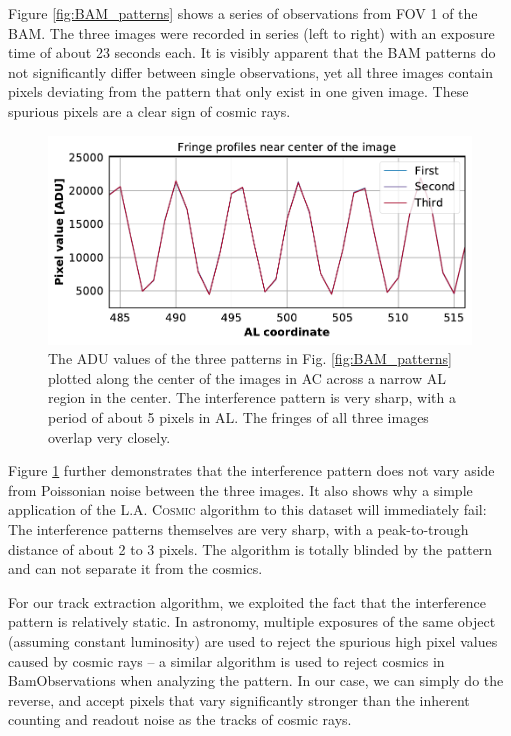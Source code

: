 \documentclass[a4paper, 11pt]{article}
\begin{document}
Figure \ref{fig:BAM_patterns} shows a series of observations from FOV 1 of the BAM. The three images were recorded in series (left to right) with an exposure time of about 23 seconds each. It is visibly apparent that the BAM patterns do not significantly differ between single observations, yet all three images contain pixels deviating from the pattern that only exist in one given image. These spurious pixels are a clear sign of cosmic rays.

\begin{figure}
  \centering
  \includegraphics[width=\textwidth]{images/extraction/BAM-OBS_fringes}
  \caption{The ADU values of the three patterns in Fig. \ref{fig:BAM_patterns} plotted along the center of the images in AC across a narrow AL region in the center. The interference pattern is very sharp, with a period of about 5 pixels in AL. The fringes of all three images overlap very closely.}
  \label{fig:BAM_fringes}
\end{figure}

Figure \ref{fig:BAM_fringes} further demonstrates that the interference pattern does not vary aside from Poissonian noise between the three images. It also shows why a simple application of the \textsc{L.A. Cosmic} algorithm to this dataset will immediately fail: The interference patterns themselves are very sharp, with a peak-to-trough distance of about 2 to 3 pixels. The algorithm is totally blinded by the pattern and can not separate it from the cosmics.

For our track extraction algorithm, we exploited the fact that the interference pattern is relatively static. In astronomy, multiple exposures of the same object (assuming constant luminosity) are used to reject the spurious high pixel values caused by cosmic rays -- a similar algorithm is used to reject cosmics in BamObservations when analyzing the pattern. In our case, we can simply do the reverse, and accept pixels that vary significantly stronger than the inherent counting and readout noise as the tracks of cosmic rays.
\end{document}
